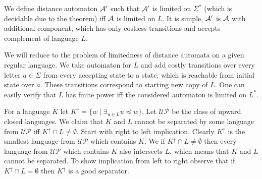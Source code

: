 
{
}

{
We define distance automaton $\mathcal{A}'$ such that $\mathcal{A}'$ is limited on $\Sigma^*$ (which is decidable
due to the theorem) iff $\mathcal{A}$ is limited on $L$. It is simple, $\mathcal{A}'$ is $\mathcal{A}$ with additional component, which
has only costless transitions and accepts complement of language $L$.
}



{
We will reduce to the problem of limitedness of distance automata on a given regular language.
We take automaton for $L$ and add costly transitions over every letter $a \in \Sigma$
from every accepting state to a state, which is reachable from initial state over $a$.
These transitions correspond to starting new copy of $L$. One can easily verify that $L$
has finite power iff the considered automaton is limited on $L^*$.
}



{
For a language $K$ let $K^\uparrow = \{w \mid \exists_{u \in L} u \preceq w\}$. Let $\mathcal{UP}$ be the class
of upward closed languages. We claim that $K$ and $L$ cannot be separated by some language from $\mathcal{UP}$
iff $K^\uparrow \cap L \neq \emptyset$. Start with right to left implication. Clearly $K^\uparrow$ is the smallest language
from $\mathcal{UP}$ which contains $K$. We if $K^\uparrow \cap L \neq \emptyset$ then every language from $\mathcal{UP}$
which contains $K$ also intersects $L$, which means that $K$ and $L$ cannot be separated. To show implication from left to right
observe that if $K^\uparrow \cap L = \emptyset$ then $K^\uparrow$ is a good separator.
}




